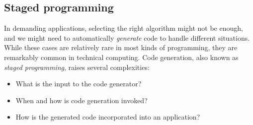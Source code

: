 







\subsection{Staged programming}

In demanding applications, selecting the right algorithm might not
be enough, and we might need to automatically \emph{generate} code
to handle different situations.
While these cases are relatively rare in most kinds of programming,
they are remarkably common in technical computing.
Code generation, also known as \emph{staged programming}, raises
several complexities:

\vspace{-3ex}
\begin{singlespace}
\begin{itemize}
\item What is the input to the code generator?
\item When and how is code generation invoked?
\item How is the generated code incorporated into an application?
\end{itemize}
\end{singlespace}

